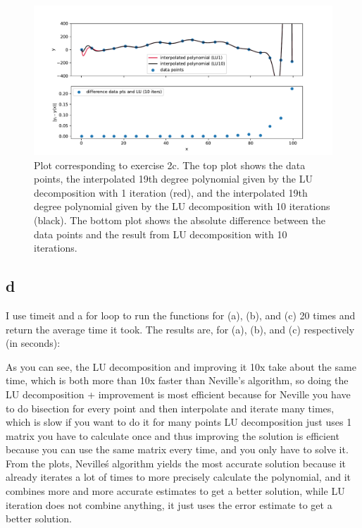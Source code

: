 \begin{figure}[h!]
  \centering
  \includegraphics[width=0.9\linewidth]{NUR1_Q2_plot3.pdf}
  \caption{Plot corresponding to exercise 2c. The top plot shows the data points, the interpolated 19th degree polynomial given by the LU decomposition with 1 iteration (red), and the interpolated 19th degree polynomial given by the LU decomposition with 10 iterations (black). The bottom plot shows the absolute difference between
  the data points and the result from LU decomposition with 10 iterations.}
  \label{fig:fig3}
\end{figure} 


\subsection{d}
I use timeit and a for loop to run the functions for (a), (b), and (c) 20 times and return the average time it took. The results are, for (a), (b), and (c) respectively (in seconds):

As you can see, the LU decomposition and improving it 10x take about the same time, which is both more than 10x faster than Neville's algorithm, so doing the LU decomposition + improvement is most efficient because for Neville you have to do bisection for every point and then interpolate and iterate many times, which is slow if you want to do it for many points
LU decomposition just uses 1 matrix you have to calculate once and thus improving the solution is efficient because you can use the same matrix every time, and you only have to solve it.
From the plots, Neville\'s algorithm yields the most accurate solution because it already iterates a lot of times to more precisely calculate the polynomial, and it combines more and more accurate estimates to get a better solution, while LU iteration does not combine anything, it just uses the error estimate to get a better solution. 
